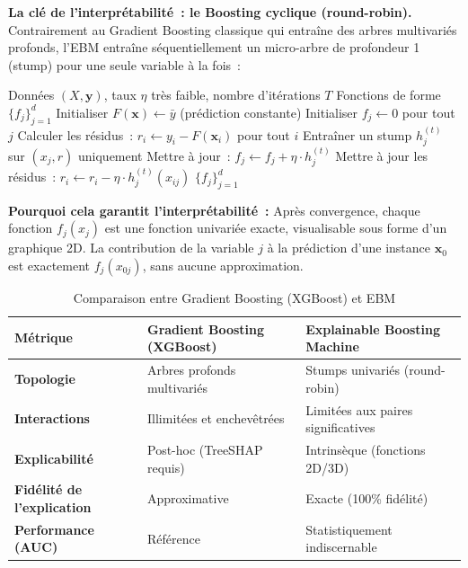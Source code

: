 \textbf{La clé de l'interprétabilité~: le Boosting cyclique (round-robin).}
Contrairement au Gradient Boosting classique qui entraîne des arbres multivariés profonds,
l'EBM entraîne séquentiellement un micro-arbre de profondeur 1 (stump) pour une seule
variable à la fois~:

\begin{algorithm}[H]
\caption{Entraînement d'une Explainable Boosting Machine}
\begin{algorithmic}[1]
\Require Données $(X, \mathbf{y})$, taux $\eta$ très faible, nombre d'itérations $T$
\Ensure Fonctions de forme $\{f_j\}_{j=1}^{d}$
\State Initialiser $F(\mathbf{x}) \leftarrow \bar{y}$ (prédiction constante)
\State Initialiser $f_j \leftarrow 0$ pour tout $j$
    \State Calculer les résidus~: $r_i \leftarrow y_i - F(\mathbf{x}_i)$ pour tout $i$
        \State Entraîner un stump $h_j^{(t)}$ sur $(x_j, r)$ uniquement
        \State Mettre à jour~: $f_j \leftarrow f_j + \eta \cdot h_j^{(t)}$
        \State Mettre à jour les résidus~: $r_i \leftarrow r_i - \eta \cdot h_j^{(t)}(x_{ij})$
    \EndFor
\EndFor
\State \Return $\{f_j\}_{j=1}^{d}$
\end{algorithmic}
\end{algorithm}

\textbf{Pourquoi cela garantit l'interprétabilité~:} Après convergence, chaque fonction
$f_j(x_j)$ est une fonction univariée exacte, visualisable sous forme d'un graphique 2D.
La contribution de la variable $j$ à la prédiction d'une instance $\mathbf{x}_0$ est exactement
$f_j(x_{0j})$, sans aucune approximation.

\begin{table}[H]
\centering
\caption{Comparaison entre Gradient Boosting (XGBoost) et EBM}
\renewcommand{\arraystretch}{1.4}
\begin{tabular}{>{\bfseries}p{3.8cm} p{4.5cm} p{4.5cm}}
\toprule
Métrique & Gradient Boosting (XGBoost) & Explainable Boosting Machine \\
\midrule
Topologie & Arbres profonds multivariés & Stumps univariés (round-robin) \\
Interactions & Illimitées et enchevêtrées & Limitées aux paires significatives \\
Explicabilité & Post-hoc (TreeSHAP requis) & Intrinsèque (fonctions 2D/3D) \\
Fidélité de l'explication & Approximative & Exacte (100\% fidélité) \\
Performance (AUC) & Référence & Statistiquement indiscernable \\
\bottomrule
\end{tabular}
\label{tab:xgboost_vs_ebm}
\end{table}

